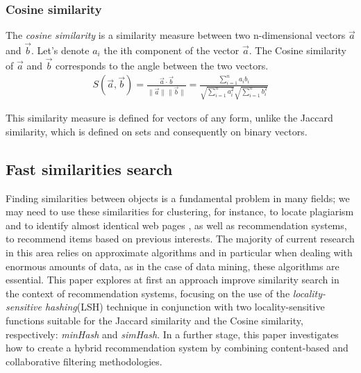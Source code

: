 \subsubsection{Cosine similarity} \label{cosine_similarity}
The \emph{cosine similarity} is a similarity measure between two n-dimensional vectors $\vec{a}$ and $\vec{b}$. Let's denote $a_i$ the ith component of the vector $\vec{a}$. The Cosine similarity of $\vec{a}$ and $\vec{b}$ corresponds to the angle between the two vectors.
\begin{equation}
\begin{aligned}
S(\vec{a},\vec{b}) = \frac{\vec{a} \cdot \vec{b}}{\lVert\vec{a}\lVert \lVert \vec{b} \lVert} = \frac{\sum_{i=1}^n{a_i b_i}}{\sqrt{\sum_{i=1}^n{a_i^2}} \sqrt{\sum_{i=1}^n{b_i^2}}}
\end{aligned}
\end{equation}

This similarity measure is defined for vectors of any form, unlike the Jaccard similarity, which is defined on sets and consequently on binary vectors. 

\subsection{Fast similarities search}
Finding similarities between objects is a fundamental problem in many fields; we may need to use these similarities for clustering, for instance, to locate plagiarism\cite{plagiarism_detection} and to identify almost identical web pages \cite{duplicate_web_pages}, as well as recommendation systems, to recommend items based on previous interests. The majority of current research in this area relies on approximate algorithms and in particular when dealing with enormous amounts of data, as in the case of data mining, these algorithms are essential. This paper explores at first an approach improve similarity search in the context of recommendation systems, focusing on the use of the \emph{locality-sensitive hashing}(LSH) technique in conjunction with two locality-sensitive functions suitable for the Jaccard similarity and the Cosine similarity, respectively: \emph{minHash}\cite{minhash} and \emph{simHash}\cite{google_simhash}. In a further stage, this paper investigates how to create a hybrid recommendation system by combining content-based and collaborative filtering methodologies. 